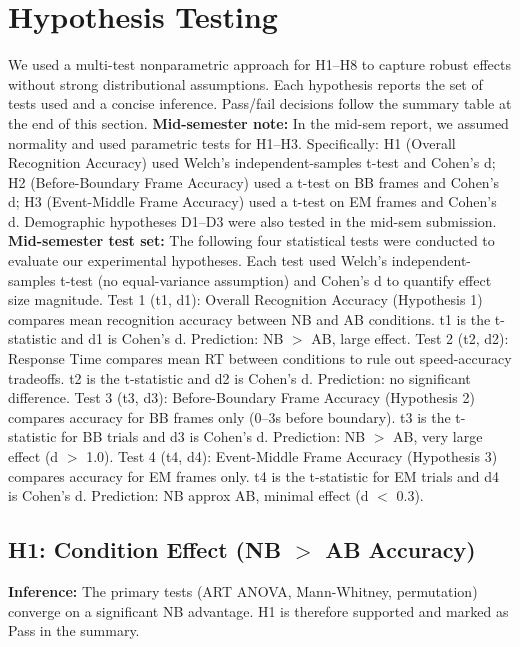 \documentclass[11pt]{article}
\begin{document}
\FloatBarrier
\section{Hypothesis Testing}
We used a multi-test nonparametric approach for H1--H8 to capture robust effects without strong distributional assumptions. Each hypothesis reports the set of tests used and a concise inference. Pass/fail decisions follow the summary table at the end of this section.
\vspace{0.2cm}
\noindent\textbf{Mid-semester note:} In the mid-sem report, we assumed normality and used parametric tests for H1--H3. Specifically: H1 (Overall Recognition Accuracy) used Welch's independent-samples t-test and Cohen's d; H2 (Before-Boundary Frame Accuracy) used a t-test on BB frames and Cohen's d; H3 (Event-Middle Frame Accuracy) used a t-test on EM frames and Cohen's d. Demographic hypotheses D1--D3 were also tested in the mid-sem submission.
\noindent\textbf{Mid-semester test set:} The following four statistical tests were conducted to evaluate our experimental hypotheses. Each test used Welch's independent-samples t-test (no equal-variance assumption) and Cohen's d to quantify effect size magnitude. Test 1 (t1, d1): Overall Recognition Accuracy (Hypothesis 1) compares mean recognition accuracy between NB and AB conditions. t1 is the t-statistic and d1 is Cohen's d. Prediction: NB $>$ AB, large effect. Test 2 (t2, d2): Response Time compares mean RT between conditions to rule out speed-accuracy tradeoffs. t2 is the t-statistic and d2 is Cohen's d. Prediction: no significant difference. Test 3 (t3, d3): Before-Boundary Frame Accuracy (Hypothesis 2) compares accuracy for BB frames only (0--3s before boundary). t3 is the t-statistic for BB trials and d3 is Cohen's d. Prediction: NB $>$ AB, very large effect (d $>$ 1.0). Test 4 (t4, d4): Event-Middle Frame Accuracy (Hypothesis 3) compares accuracy for EM frames only. t4 is the t-statistic for EM trials and d4 is Cohen's d. Prediction: NB approx AB, minimal effect (d $<$ 0.3).

\subsection{H1: Condition Effect (NB $>$ AB Accuracy)}
\begin{table}[htbp]
\centering
\caption{H1 tests}
\end{table}
\textbf{Inference:} The primary tests (ART ANOVA, Mann-Whitney, permutation) converge on a significant NB advantage. H1 is therefore supported and marked as Pass in the summary.
\end{document}
